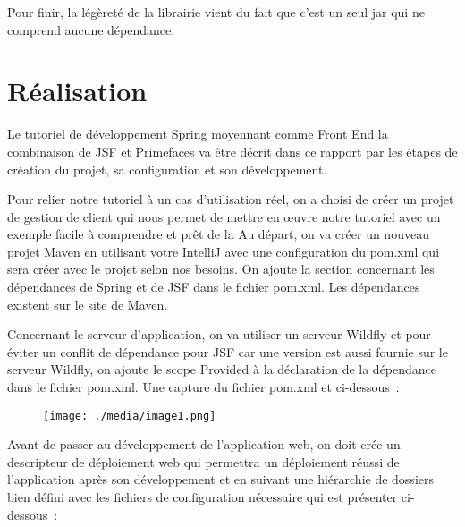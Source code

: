 \documentclass[12pt]{article}
\begin{document}
Pour finir, la légèreté de la librairie vient du fait que c’est un seul jar qui ne comprend aucune dépendance.\par

\section{Réalisation}

\vspace{\baselineskip}
Le tutoriel de développement Spring moyennant comme Front End la combinaison de JSF et Primefaces va être décrit dans ce rapport par les étapes de création du projet, sa configuration et son développement.\par

Pour relier notre tutoriel à un cas d’utilisation réel, on a choisi de créer un projet de gestion de client qui nous permet de mettre en œuvre notre tutoriel avec un exemple facile à comprendre et prêt de la Au départ, on va créer un nouveau projet Maven en utilisant votre IntelliJ avec une configuration du pom.xml qui sera créer avec le projet selon nos besoins. On ajoute la section concernant les dépendances de Spring et de JSF dans le fichier pom.xml. Les dépendances existent sur le site de Maven.\par

Concernant le serveur d’application, on va utiliser un serveur Wildfly et pour éviter un conflit de dépendance pour JSF car une version est aussi fournie sur le serveur Wildfly, on ajoute le scope Provided à la déclaration de la dépendance dans le fichier pom.xml. Une capture du fichier pom.xml et ci-dessous :\par




\begin{figure}[H]
	\begin{Center}
		\texttt{[image: ./media/image1.png]}
	\end{Center}
\end{figure}



\par

Avant de passer au développement de l’application web, on doit crée un descripteur de déploiement web qui permettra un déploiement réussi de l’application après son développement et en suivant une hiérarchie de dossiers bien défini avec les fichiers de configuration nécessaire qui est présenter ci-dessous :\par
\end{document}
